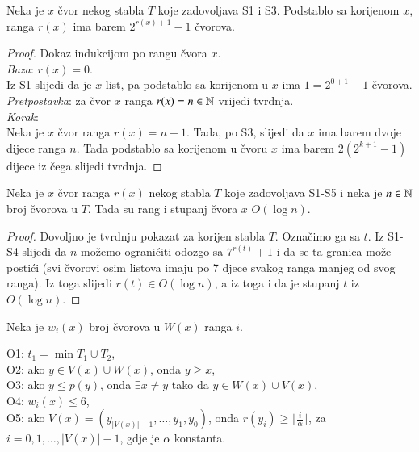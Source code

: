 \begin{lem}\label{Exp_cv}
  Neka je $x$ \v{c}vor nekog stabla $T$ koje zadovoljava S1 i S3. Podstablo sa korijenom $x$, ranga $r(x)$ ima barem $2^{r(x)+1} - 1$ \v{c}vorova.
\end{lem}
\begin{proof}
  Dokaz indukcijom po rangu \v{c}vora $x$.\\
  \emph{Baza}: $r(x) = 0$.\\
  \indent Iz S1 slijedi da je $x$ list, pa podstablo sa korijenom u $x$ ima $1 = 2^{0 + 1} - 1$ \v{c}vorova.\\
  \emph{Pretpostavka}: za \v{c}vor $x$ ranga $r(x) = n \in \mathbb{N}$ vrijedi tvrdnja.\\
  \emph{Korak}:\\
  \indent Neka je $x$ \v{c}vor ranga $r(x) = n+1$. Tada, po S3, slijedi da $x$ ima barem dvoje dijece ranga $n$. Tada podstablo sa korijenom u \v{c}voru $x$ ima barem $2(2^{k + 1} - 1)$ dijece iz \v{c}ega slijedi tvrdnja.
\end{proof}

\begin{lem}\label{Log_cv}
  Neka je $x$ \v{c}vor ranga $r(x)$ nekog stabla $T$ koje zadovoljava S1-S5 i neka je $n \in \mathbb{N}$ broj \v{c}vorova u $T$. Tada su rang i stupanj \v{c}vora $x$ $O(\log n)$.
\end{lem}
\begin{proof}
  Dovoljno je tvrdnju pokazat za korijen stabla $T$. Ozna\v{c}imo ga sa $t$.
  Iz S1-S4 slijedi da $n$ mo\v{z}emo ograni\'{c}iti odozgo sa $7^{r(t)} + 1$ i da se ta granica mo\v{z}e posti\'{c}i (svi \v{c}vorovi osim listova imaju po 7 djece svakog ranga manjeg od svog ranga).
  Iz toga slijedi $r(t) \in O(\log n)$, a iz toga i da je stupanj $t$ iz $O(\log n)$.
\end{proof}



\begin{defn}\label{O_inv}
  Neka je $w_{i}(x)$ broj \v{c}vorova u $W(x)$ ranga $i$.
  \begin{myindentpar}{15pt}
    O1: $t_{1} = \min T_{1} \cup T_{2}$, \\
    O2: ako $y \in V(x) \cup W(x)$, onda $y \ge x$, \\
    O3: ako $y \le p(y)$, onda $\exists x \ne y$ tako da $y \in W(x) \cup V(x)$, \\
    O4: $w_{i}(x) \le 6$, \\
    O5: ako $V(x) = (y_{|V(x)| - 1},\dotsc,y_{1},y_{0})$, onda $r(y_{i}) \ge \lfloor\frac{i}{\alpha}\rfloor$, za $i = 0,1,\dotsc,|V(x)| - 1$, gdje je $\alpha$ konstanta.
  \end{myindentpar}
\end{defn}

